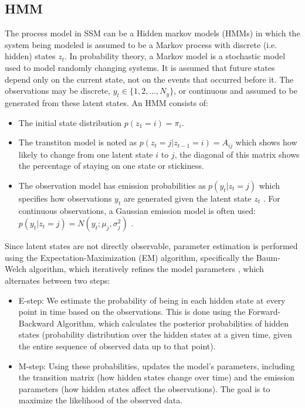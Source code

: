 \subsection{HMM}

The process model in SSM  can be a Hidden markov models (HMMs) in which the system being modeled is assumed to be a Markov process with discrete (i.e. hidden) states $z_{t}$. In probability theory, a Markov model is a stochastic model used to model randomly changing systems. It is assumed that future states depend only on the current state, not on the events that occurred before it.
The observations may be discrete, $y_{t}\in \{1, 2, \dots, N_{y}\}$, or continuous and assumed to be generated from these latent states. 
An HMM consists of: 
\begin{itemize}
    \item The initial state distribution $p(z_{1}=i)=\pi_{i} $.
    \item The transtiton model is noted as $p(z_{t}=j|z_{t-1}=i)=A_{ij} $ which shows how likely to change from one latent state $i$ to $j$, the diagonal of this matrix shows the percentage of staying on one state or stickiness.
    \item The observation model has emission probabilities as $p(y_{t}|z_{t}=j) $ which specifies how observations $y_{t}$ are generated given the latent state $z_{t}$ .
For continuous observations, a Gaussian emission model is often used:  $p(y_{t}|z_{t}=j) = N(y_{t}; \mu_{j},\sigma^2_{j})$ . 
\end{itemize}
Since latent states are not directly observable, parameter estimation is performed using the Expectation-Maximization (EM) algorithm, specifically the Baum-Welch algorithm, which iteratively refines the model parameters , which alternates between two steps:
\begin{itemize}
    \item E-step: We estimate the probability of being in each hidden state at every point in time based on the observations. This is done using the Forward-Backward Algorithm, which calculates the posterior probabilities of hidden states (probability distribution over the hidden states at a given time, given the entire sequence of observed data up to that point).
    \item M-step: Using these probabilities, updates the model’s parameters, including the transition matrix (how hidden states change over time) and the emission parameters (how hidden states affect the observations). The goal is to maximize the likelihood of the observed data.
\end{itemize}

